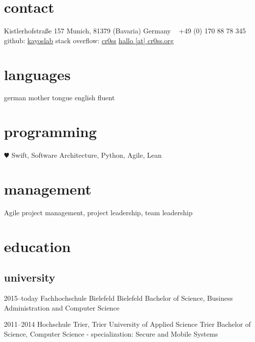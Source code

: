 \documentclass[]{friggeri-cv} %
\begin{document}


\begin{aside} %
	\section{contact}
	Kistlerhofstraße 157
	Munich, 81379 
	(Bavaria) Germany
	~
	+49 (0) 170 88 78 345
	github: \href{https://github.com/kayoslab}{kayoslab}
	stack overflow: \href{https://stackoverflow.com/story/cr0ss}{cr0ss}
	\href{mailto:hello@cr0ss.org}{hallo [at] cr0ss.org}
	~
	\section{languages}
	german mother tongue
	english fluent
	\section{programming}
	{\color{red} $\varheartsuit$} Swift,
	Software Architecture,
	Python, Agile, Lean
	\section{management}
	Agile project management,
	project leadership,
	team leadership
\end{aside}


\section{education}

\subsection{university}

\begin{entrylist}
	
	\entry
	{2015--today}
	{Fachhochschule Bielefeld}
	{Bielefeld}
	{Bachelor of Science, Business Administration and Computer Science}
	
	
	\entry
	{2011--2014}
	{Hochschule Trier, Trier University of Applied Science}
	{Trier}
	{Bachelor of Science, Computer Science - specialization: Secure and Mobile Systems}
	
	
\end{entrylist}
\end{document}
